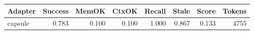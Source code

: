 \begin{tabular}{lrrrrrrr}
\hline
Adapter & Success & MemOK & CtxOK & Recall & Stale & Score & Tokens \\
\hline
capsule & 0.783 & 0.100 & 0.100 & 1.000 & 0.867 & 0.133 & 4755 \\
\hline
\end{tabular}
